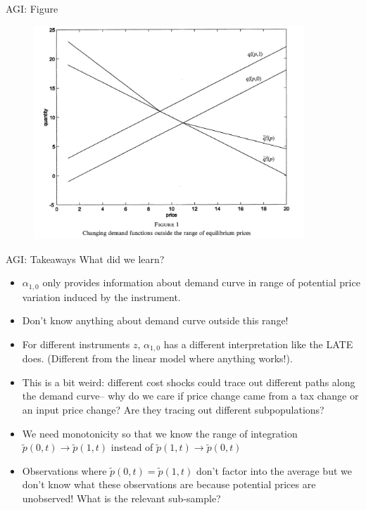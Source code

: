 \documentclass[xcolor=pdftex,dvipsnames,table,mathserif,aspectratio=169]{beamer}
\begin{document}
\begin{frame}{AGI: Figure}
\begin{figure}
\begin{center}
\includegraphics[width=4in]{resources/fishfigure.png}
\end{center}
\end{figure}
\end{frame}

\begin{frame}{AGI: Takeaways}
\small
What did we learn?
\begin{itemize}
\item $\alpha_{1,0}$ only provides information about demand curve in range of potential price variation induced by the instrument.
\item Don't know anything about demand curve outside this range!
\item For different instruments $z$, $\alpha_{1,0}$ has a different interpretation like the LATE does. (Different from the linear model where anything works!).
\item This is a bit weird: different cost shocks could trace out different paths along the demand curve-- why do we care if price change came from a tax change or an input price change? Are they tracing out different subpopulations?
\item We need monotonicity so that we know the range of integration $\tilde{p}(0,t) \rightarrow \tilde{p}(1,t)$ instead of $\tilde{p}(1,t) \rightarrow \tilde{p}(0,t)$
\item Observations where $\tilde{p}(0,t) = \tilde{p}(1,t)$ don't factor into the average but we don't know what these observations are because potential prices are unobserved! What is the relevant sub-sample?
\end{itemize}
\end{frame}
\end{document}
